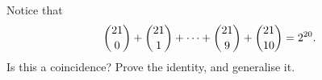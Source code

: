 Notice that
\[\dbinom{21}{0}+\dbinom{21}{1}+\cdots+\dbinom{21}{9}+\dbinom{21}{10}=2^{20}.\]
Is this a coincidence? Prove the identity, and generalise it.
